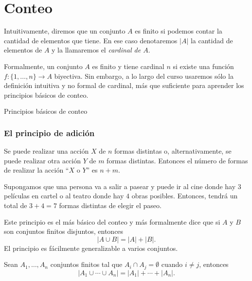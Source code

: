 \chapter[Conteo]{Conteo}\label{cap.conteo}

Intuitivamente, diremos que un conjunto $A$ es finito si podemos contar la cantidad de elementos que tiene. En ese caso denotaremos $|A|$ la cantidad de elementos de $A$ y la llamaremos el {\em cardinal de $A$}.  

Formalmente, un conjunto $A$ es finito y tiene  cardinal $n$  si existe una función $f: \{1,\ldots,n\} \to A$ biyectiva. Sin embargo,  a lo largo del curso usaremos sólo la definición intuitiva y  no formal de cardinal, más que suficiente para aprender los principios básicos de conteo.  

\begin{section}{Principios básicos de conteo}\label{seccion-principios-basicos-de-conteo}


\subsection*{El principio de adición}

Se puede realizar una acción $X$ de $n$ formas distintas o, alternativamente, se puede realizar otra acción $Y$ de $m$ formas distintas. Entonces el número de formas de realizar la acción ``$X$ o $Y$'' es $n + m$.

\begin{ejemplo}\label{cine} Supongamos que una persona va a salir a pasear  y puede ir al cine donde hay $3$ películas en cartel o al teatro donde hay $4$ obras posibles. Entonces, tendrá un total de $3+4=7$ formas distintas de elegir el paseo. 
\end{ejemplo}


Este principio es el más básico del conteo y más formalmente dice que si $A$ y $B$ son conjuntos finitos disjuntos, entonces 
\begin{equation*}
|A \cup B| =|A|+|B|.
\end{equation*}
El principio es fácilmente generalizable a varios conjuntos.

\begin{proposicion}\label{principiodeadicion}
Sean $A_1,\ldots,A_n$ conjuntos finitos tal que $A_i \cap A_j = \emptyset$ cuando $i\not=j$, entonces 
\begin{equation*}
|A_1 \cup \cdots \cup A_n| =|A_1|+\cdots+|A_n|.
\end{equation*}
\end{proposicion}




\end{section}
